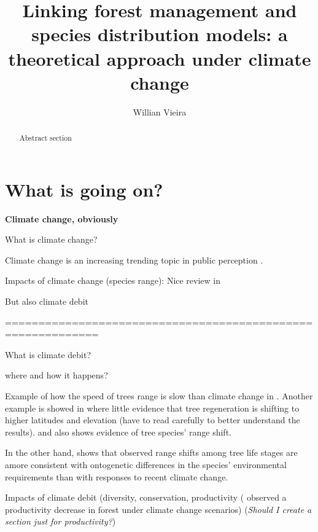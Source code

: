 




\title{Linking forest management and species distribution models: a theoretical approach under climate change}

\author{Willian Vieira}

\maketitle

\begin{abstract}

Abstract section

\end{abstract}

\section{What is going on?}

\textbf{Climate change, obviously}

What is climate change? 

Climate change is an increasing trending topic in public perception \citep{Capstick2015}.

Impacts of climate change (species range): Nice review in \cite{Price2013}

But also climate debit

============================================================

What is climate debit?

where and how it happens?

Example of how the speed of trees range is slow than climate change in \cite{Sittaro2017}. Another example is showed in \cite{Serra-Diaz2016} where little evidence that tree regeneration is shifting to higher latitudes and elevation (have to read carefully to better understand the results). \cite{Monleon2015} and \cite{Boisvert-Marsh2014} also shows evidence of tree species' range shift.

In the other hand, \cite{Malis2016} shows that observed range shifts among tree life stages are amore consistent with ontogenetic differences in the species' environmental requirements than with responses to recent climate change.

Impacts of climate debit (diversity, conservation, productivity (\cite{Lasch2002} observed a productivity decrease in forest under climate change scenarios) (\textit{Should I create a section just for productivity?})

